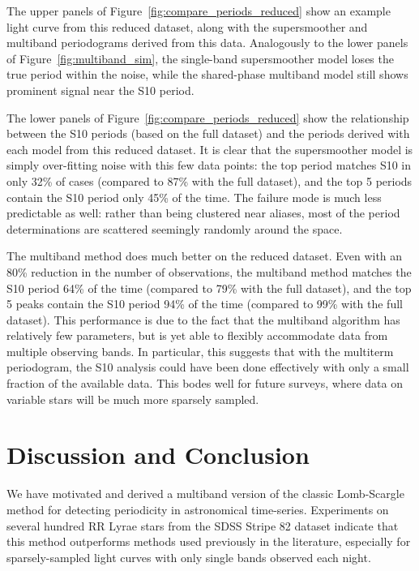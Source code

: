\documentclass[12pt,preprint]{aastex}
\newcommand{\Fig}[1]{Figure~\ref{fig:#1}}
\newcommand{\fig}[1]{\Fig{#1}}
\newcommand{\sectlabel}[1]{\label{sect:#1}}
\begin{document}
The upper panels of \fig{compare_periods_reduced} show an example light curve from this reduced dataset, along with the supersmoother and multiband periodograms derived from this data. Analogously to the lower panels of \fig{multiband_sim}, the single-band supersmoother model loses the true period within the noise, while the shared-phase multiband model still shows prominent signal near the S10 period.

The lower panels of \fig{compare_periods_reduced} show the relationship between the S10 periods (based on the full dataset) and the periods derived with each model from this reduced dataset. It is clear that the supersmoother model is simply over-fitting noise with this few data points: the top period matches S10 in only 32\% of cases (compared to 87\% with the full dataset), and the top 5 periods contain the S10 period only 45\% of the time. The failure mode is much less predictable as well: rather than being clustered near aliases, most of the period determinations are scattered seemingly randomly around the space.

The multiband method does much better on the reduced dataset. Even with an 80\% reduction in the number of observations, the multiband method matches the S10 period 64\% of the time (compared to 79\% with the full dataset), and the top 5 peaks contain the S10 period 94\% of the time (compared to 99\% with the full dataset). This performance is due to the fact that the multiband algorithm has relatively few parameters, but is yet able to flexibly accommodate data from multiple observing bands. In particular, this suggests that with the multiterm periodogram, the S10 analysis could have been done effectively with only a small fraction of the available data. This bodes well for future surveys, where data on variable stars will be much more sparsely sampled.

\section{Discussion and Conclusion}
\sectlabel{discussion}

We have motivated and derived a multiband version of the classic Lomb-Scargle method for detecting periodicity in astronomical time-series.
 Experiments on several hundred RR Lyrae stars from the SDSS Stripe 82 dataset indicate that this method outperforms methods used previously in the literature, especially for sparsely-sampled light curves with only single bands observed each night.
\end{document}
